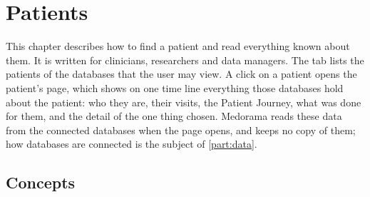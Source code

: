 \chapter{Patients}
\label{chap:patients}

This chapter describes how to find a patient and read everything known about them. It is
written for clinicians, researchers and data managers. The  tab lists the
patients of the databases that the user may view. A click on a patient opens the patient's page,
which shows on one time line everything those databases hold about the patient: who they are,
their visits, the Patient Journey, what was done for them, and the detail of the one thing
chosen.
Medorama reads these data from the connected databases when the page opens, and keeps no copy of
them; how databases are connected is the subject of \cref{part:data}.

\section{Concepts}
\label{sec:patients-concepts}

